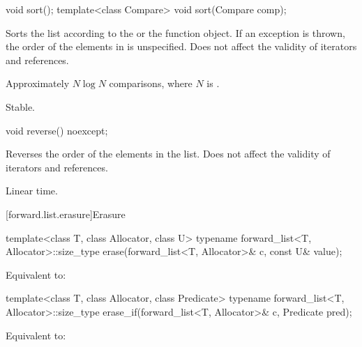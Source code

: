 %
\begin{itemdecl}
void sort();
template<class Compare> void sort(Compare comp);
\end{itemdecl}

\begin{itemdescr}
\pnum
\effects
Sorts the list according to the  or the  function object.
If an exception is thrown, the order of the elements in  is unspecified.
Does not affect the validity of iterators and references.

\pnum
\complexity
Approximately $N \log N$ comparisons, where $N$ is .

\pnum
\remarks
Stable.
\end{itemdescr}

%
\begin{itemdecl}
void reverse() noexcept;
\end{itemdecl}

\begin{itemdescr}
\pnum
\effects
Reverses the order of the elements in the list.
Does not affect the validity of iterators and references.

\pnum
\complexity
Linear time.
\end{itemdescr}

[forward.list.erasure]{Erasure}

%
\begin{itemdecl}
template<class T, class Allocator, class U>
  typename forward_list<T, Allocator>::size_type
    erase(forward_list<T, Allocator>& c, const U& value);
\end{itemdecl}

\begin{itemdescr}
\pnum
\effects
Equivalent to: 
\end{itemdescr}

%
\begin{itemdecl}
template<class T, class Allocator, class Predicate>
  typename forward_list<T, Allocator>::size_type
    erase_if(forward_list<T, Allocator>& c, Predicate pred);
\end{itemdecl}

\begin{itemdescr}
\pnum
\effects
Equivalent to: 
\end{itemdescr}

